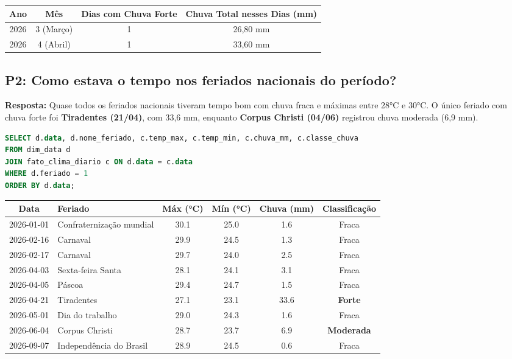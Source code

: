 \documentclass[11pt,a4paper]{article}
\begin{document}
\begin{table}[h!]
\centering
\small
\begin{tabular}{cccc}
\toprule
\textbf{Ano} & \textbf{Mês} & \textbf{Dias com Chuva Forte} & \textbf{Chuva Total nesses Dias (mm)} \\
\midrule
2026 & 3 (Março) & 1 & 26,80 mm \\
2026 & 4 (Abril) & 1 & 33,60 mm \\
\bottomrule
\end{tabular}
\end{table}

\subsection*{P2: Como estava o tempo nos feriados nacionais do período?}
\noindent\textbf{Resposta:} Quase todos os feriados nacionais tiveram tempo bom com chuva fraca e máximas entre 28°C e 30°C. O único feriado com chuva forte foi \textbf{Tiradentes (21/04)}, com 33,6 mm, enquanto \textbf{Corpus Christi (04/06)} registrou chuva moderada (6,9 mm).

\begin{lstlisting}[language=SQL]
SELECT d.data, d.nome_feriado, c.temp_max, c.temp_min, c.chuva_mm, c.classe_chuva
FROM dim_data d
JOIN fato_clima_diario c ON d.data = c.data
WHERE d.feriado = 1
ORDER BY d.data;
\end{lstlisting}

\begin{table}[h!]
\centering
\small
\begin{tabular}{clcccc}
\toprule
\textbf{Data} & \textbf{Feriado} & \textbf{Máx (°C)} & \textbf{Mín (°C)} & \textbf{Chuva (mm)} & \textbf{Classificação} \\
\midrule
2026-01-01 & Confraternização mundial & 30.1 & 25.0 & 1.6 & Fraca \\
2026-02-16 & Carnaval & 29.9 & 24.5 & 1.3 & Fraca \\
2026-02-17 & Carnaval & 29.7 & 24.0 & 2.5 & Fraca \\
2026-04-03 & Sexta-feira Santa & 28.1 & 24.1 & 3.1 & Fraca \\
2026-04-05 & Páscoa & 29.4 & 24.7 & 1.5 & Fraca \\
2026-04-21 & Tiradentes & 27.1 & 23.1 & 33.6 & \textbf{Forte} \\
2026-05-01 & Dia do trabalho & 29.0 & 24.3 & 1.6 & Fraca \\
2026-06-04 & Corpus Christi & 28.7 & 23.7 & 6.9 & \textbf{Moderada} \\
2026-09-07 & Independência do Brasil & 28.9 & 24.5 & 0.6 & Fraca \\
\bottomrule
\end{tabular}
\end{table}
\end{document}
